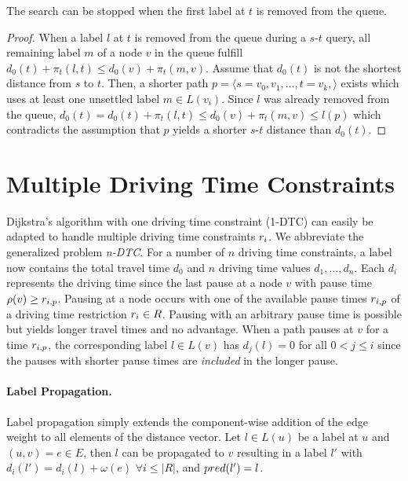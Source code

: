 \begin{theorem}\label{theorem:pot_stop_criterion}
	The search can be stopped when the first label at $t$ is removed from the queue.
\end{theorem}

\begin{proof}
	When a label $l$ at $t$ is removed from the queue during a $s$-$t$ query, all remaining label $m$ of a node $v$ in the queue fulfill $d_0(t) + \pi_t(l,t) \le d_0(v) + \pi_t(m,v)$. Assume that $d_0(t)$ is not the shortest distance from $s$ to $t$. Then, a shorter path $p = \langle s=v_0,v_1,\ldots,t=v_k, \rangle$ exists which uses at least one unsettled label $m \in L(v_i)$. Since $l$ was already removed from the queue, $d_0(t) = d_0(t) + \pi_t(l,t) \le  d_0(v) + \pi_t(m,v) \le l(p)$ which contradicts the assumption that $p$ yields a shorter $s$-$t$ distance than $d_0(t)$.
\end{proof}

\section{Multiple Driving Time Constraints}
Dijkstra's algorithm with one driving time constraint (1-DTC) can easily be adapted to handle multiple driving time constraints $r_i$. We abbreviate the generalized problem \emph{n-DTC}. For a number of $n$ driving time constraints, a label now contains the total travel time $d_0$ and $n$ driving time values $d_1, \ldots , d_n$. Each $d_i$ represents the driving time since the last pause at a node $v$ with pause time $\rho(v) \ge r_{i,p}$. Pausing at a node occurs with one of the available pause times $r_{i,p}$ of a driving time restriction $r_i \in R$. Pausing with an arbitrary pause time is possible but yields longer travel times and no advantage. When a path pauses at $v$ for a time $r_{i,p}$, the corresponding label $l \in L(v)$ has $d_j(l) = 0$ for all $0 < j \le i$ since the pauses with shorter pause times are \emph{included} in the longer pause.

\paragraph{Label Propagation.}
Label propagation simply extends the component-wise addition of the edge weight to all elements of the distance vector. Let $l \in L(u)$ be a label at $u$ and $(u,v) = e \in E$, then $l$ can be propagated to $v$ resulting in a label $l'$ with $d_i(l') = d_i(l) + \omega(e)$ $\forall i \le |R|$, and $pred(l') = l$.

